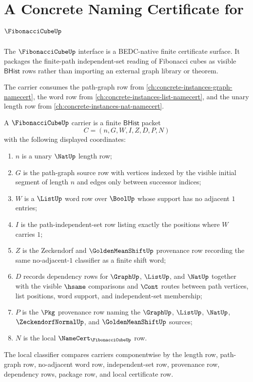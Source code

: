 \chapter{A Concrete Naming Certificate for $\FibonacciCubeUp$}
\label{ch:concrete-instances-fibonaccicube-namecert}

The $\FibonacciCubeUp$ interface is a BEDC-native finite certificate surface. It packages the finite-path independent-set reading of Fibonacci cubes as visible $\mathsf{BHist}$ rows rather than importing an external graph library or theorem.

The carrier consumes the path-graph row from \autoref{ch:concrete-instances-graph-namecert}, the word row from \autoref{ch:concrete-instances-list-namecert}, and the unary length row from \autoref{ch:concrete-instances-nat-namecert}.

\begin{definition}
\label{def:fibonacci-cube-carrier}
A $\FibonacciCubeUp$ carrier is a finite $\mathsf{BHist}$ packet
$$
C=(n,G,W,I,Z,D,P,N)
$$
with the following displayed coordinates:
\begin{enumerate}
\item $n$ is a unary $\NatUp$ length row;
\item $G$ is the path-graph source row with vertices indexed by the visible initial segment of length $n$ and edges only between successor indices;
\item $W$ is a $\ListUp$ word row over $\BoolUp$ whose support has no adjacent $1$ entries;
\item $I$ is the path-independent-set row listing exactly the positions where $W$ carries $1$;
\item $Z$ is the Zeckendorf and $\GoldenMeanShiftUp$ provenance row recording the same no-adjacent-$1$ classifier as a finite shift word;
\item $D$ records dependency rows for $\GraphUp$, $\ListUp$, and $\NatUp$ together with the visible $\hsame$ comparisons and $\Cont$ routes between path vertices, list positions, word support, and independent-set membership;
\item $P$ is the $\Pkg$ provenance row naming the $\GraphUp$, $\ListUp$, $\NatUp$, $\ZeckendorfNormalUp$, and $\GoldenMeanShiftUp$ sources;
\item $N$ is the local $\NameCert_{\FibonacciCubeUp}$ row.
\end{enumerate}
The local classifier compares carriers componentwise by the length row, path-graph row, no-adjacent word row, independent-set row, provenance row, dependency rows, package row, and local certificate row.
\end{definition}

